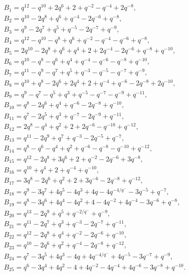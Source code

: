 \documentclass[pdftex]{sigma}
\numberwithin{equation}{section}
\theoremstyle{definition}
\begin{document}
\begin{gather*}
 B_1 = q^{12}-q^{10}+2q^{6}+2+q^{-2}-q^{-4}+2q^{-8}, \\[-1pt]
 B_2 = q^{10}-2q^{8}+q^{6}+q^{-4}-2q^{-6}+q^{-8}, \\[-1pt]
 B_3 = q^{9}-2q^{7}+q^{5}+q^{-5}-2q^{-7}+q^{-9}, \\[-1pt]
 B_4 = q^{12}-q^{10}-q^{8}+q^{6}+q^{-2}-q^{-4}-q^{-6}+q^{-8}, \\[-1pt]
 B_5 = 2q^{10}-2q^{8}+q^{6}+q^{4}+2+2q^{-4}-2q^{-6}+q^{-8}+q^{-10}, \\[-1pt]
 B_6 = q^{10}-q^{8}-q^{6}+q^{4}+q^{-4}-q^{-6}-q^{-8}+q^{-10}, \\[-1pt]
 B_7 = q^{11}-q^{9}-q^{7}+q^{5}+q^{-3}-q^{-5}-q^{-7}+q^{-9},\\[-1pt]
 B_8 = q^{10}+q^{8}-2q^{6}+2q^{4}+2+q^{-4}+q^{-6}-2q^{-8}+2q^{-10}, \\[-1pt]
 B_9 = q^{9}-q^{7}-q^{5}+q^{3}+q^{-5}-q^{-7}-q^{-9}+q^{-11}, \\[-1pt]
 B_{10} = q^{8}-2q^{6}+q^{4}+q^{-6}-2q^{-8}+q^{-10}, \\[-1pt]
 B_{11} = q^{7}-2q^{5}+q^{3}+q^{-7}-2q^{-9}+q^{-11}, \\[-1pt]
 B_{12} = 2q^{8}-q^{4}+q^{2}+2+2q^{-6}-q^{-10}+q^{-12}, \\[-1pt]
 B_{13} = q^{11}-2q^{9}+q^{7}+q^{-3}-2q^{-5}+q^{-7}, \\[-1pt]
 B_{14} = q^{8}-q^{6}-q^{4}+q^{2}+q^{-6}-q^{-8}-q^{-10}+q^{-12}, \\[-1pt]
 B_{15} = q^{12}-2q^{8}+3q^{6}+2+q^{-2}-2q^{-6}+3q^{-8},\\[-1pt]
 B_{16} = q^{10}+q^{4}+2+q^{-4}+q^{-10}, \\[-1pt]
 B_{17} = 3q^{8}-2q^{6}+q^{2}+2+3q^{-6}-2q^{-8}+q^{-12}, \\[-1pt]
 B_{18} = q^{9}-3q^{7}+4q^{5}-4q^{3}+4q-4q^{-4/q^{-}}-3q^{-5}+q^{-7}, \\[-1pt]
 B_{19} = q^{8}-3q^{6}+4q^{4}-4q^{2}+4-4q^{-2}+4q^{-4}-3q^{-6}+q^{-8}, \\[-1pt]
 B_{20} = q^{13}-2q^{9}+q^{5}+q^{-2/q^{-}}+q^{-9}, \\[-1pt]
 B_{21} = q^{11}-2q^{7}+q^{3}+q^{-3}-2q^{-7}+q^{-11}, \\[-1pt]
 B_{22} = q^{12}-2q^{8}+q^{4}+q^{-2}-2q^{-6}+q^{-10}, \\[-1pt]
 B_{23} = q^{10}-2q^{6}+q^{2}+q^{-4}-2q^{-8}+q^{-12}, \\[-1pt]
 B_{24} = q^{7}-3q^{5}+4q^{3}-4q+4q^{-4/q^{-}}+4q^{-5}-3q^{-7}+q^{-9}, \\[-1pt]
 B_{25} = q^{6}-3q^{4}+4q^{2}-4+4q^{-2}-4q^{-4}+4q^{-6}-3q^{-8}+q^{-10}.
\end{gather*}
\end{document}
